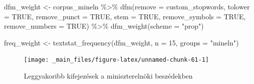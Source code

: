 \documentclass[
]{book}
\newenvironment{Shaded}{\begin{snugshade}}{\end{snugshade}}
\newcommand{\AttributeTok}[1]{\textcolor[rgb]{0.77,0.63,0.00}{#1}}
\newcommand{\ConstantTok}[1]{\textcolor[rgb]{0.00,0.00,0.00}{#1}}
\newcommand{\DecValTok}[1]{\textcolor[rgb]{0.00,0.00,0.81}{#1}}
\newcommand{\FunctionTok}[1]{\textcolor[rgb]{0.00,0.00,0.00}{#1}}
\newcommand{\NormalTok}[1]{#1}
\newcommand{\OtherTok}[1]{\textcolor[rgb]{0.56,0.35,0.01}{#1}}
\newcommand{\SpecialCharTok}[1]{\textcolor[rgb]{0.00,0.00,0.00}{#1}}
\newcommand{\StringTok}[1]{\textcolor[rgb]{0.31,0.60,0.02}{#1}}
\begin{document}
\begin{Shaded}
\begin{Highlighting}[]
\NormalTok{dfm\_weight }\OtherTok{\textless{}{-}}\NormalTok{ corpus\_mineln }\SpecialCharTok{\%\textgreater{}\%} \FunctionTok{dfm}\NormalTok{(}\AttributeTok{remove =}\NormalTok{ custom\_stopwords, }\AttributeTok{tolower =} \ConstantTok{TRUE}\NormalTok{, }\AttributeTok{remove\_punct =} \ConstantTok{TRUE}\NormalTok{, }
    \AttributeTok{stem =} \ConstantTok{TRUE}\NormalTok{, }\AttributeTok{remove\_symbols =} \ConstantTok{TRUE}\NormalTok{, }\AttributeTok{remove\_numbers =} \ConstantTok{TRUE}\NormalTok{) }\SpecialCharTok{\%\textgreater{}\%} \FunctionTok{dfm\_weight}\NormalTok{(}\AttributeTok{scheme =} \StringTok{"prop"}\NormalTok{)}

\NormalTok{freq\_weight }\OtherTok{\textless{}{-}} \FunctionTok{textstat\_frequency}\NormalTok{(dfm\_weight, }\AttributeTok{n =} \DecValTok{15}\NormalTok{, }\AttributeTok{groups =} \StringTok{"mineln"}\NormalTok{)}
\end{Highlighting}
\end{Shaded}

\begin{Shaded}
\end{Shaded}

\begin{figure}

{\centering \texttt{[image: \_main\_files/figure-latex/unnamed-chunk-61-1]} 

}

\caption{Leggyakoribb kifejezések a miniszterelnöki beszédekben}\label{fig:unnamed-chunk-61}
\end{figure}
\end{document}
